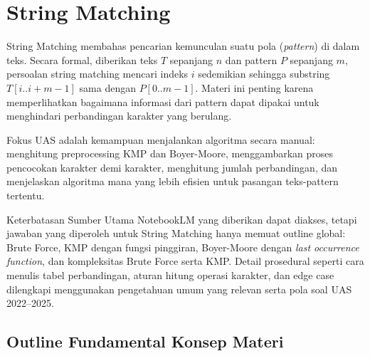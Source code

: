 \section{String Matching}

String Matching membahas pencarian kemunculan suatu pola (\textit{pattern}) di dalam teks. Secara formal, diberikan teks $T$ sepanjang $n$ dan pattern $P$ sepanjang $m$, persoalan string matching mencari indeks $i$ sedemikian sehingga substring $T[i..i+m-1]$ sama dengan $P[0..m-1]$. Materi ini penting karena memperlihatkan bagaimana informasi dari pattern dapat dipakai untuk menghindari perbandingan karakter yang berulang.

Fokus UAS adalah kemampuan menjalankan algoritma secara manual: menghitung preprocessing KMP dan Boyer-Moore, menggambarkan proses pencocokan karakter demi karakter, menghitung jumlah perbandingan, dan menjelaskan algoritma mana yang lebih efisien untuk pasangan teks-pattern tertentu.

\begin{cmt}{Keterbatasan Sumber Utama}{}
NotebookLM yang diberikan dapat diakses, tetapi jawaban yang diperoleh untuk String Matching hanya memuat outline global: Brute Force, KMP dengan fungsi pinggiran, Boyer-Moore dengan \textit{last occurrence function}, dan kompleksitas Brute Force serta KMP. Detail prosedural seperti cara menulis tabel perbandingan, aturan hitung operasi karakter, dan edge case dilengkapi menggunakan pengetahuan umum yang relevan serta pola soal UAS 2022--2025.
\end{cmt}

\subsection{Outline Fundamental Konsep Materi}

